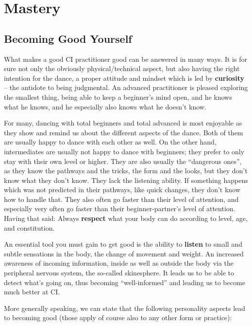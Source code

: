 \chapter{Mastery}\label{ch:mastery}


\section{Becoming Good Yourself}\label{sec:becoming-good-yourself}

What makes a good CI practitioner good can be answered in many ways.
It is for sure not only the obviously physical/technical aspect, but also having the right intention for the dance, a proper attitude and mindset which is led by \textbf{curiosity} -- the antidote to being judgmental.
An advanced practitioner is pleased exploring the smallest thing, being able to keep a beginner's mind open, and he knows what he knows, and he especially also knows what he doesn't know.

For many, dancing with total beginners and total advanced is most enjoyable as they show and remind us about the different aspects of the dance.
Both of them are usually happy to dance with each other as well.
On the other hand, intermediates are usually not happy to dance with beginners; they prefer to only stay with their own level or higher.
They are also usually the ``dangerous ones'', as they know the pathways and the tricks, the form and the looks, but they don't know what they don't know.
They lack the listening ability.
If something happens which was not predicted in their pathways, like quick changes, they don't know how to handle that.
They also often go faster than their level of attention, and especially very often go faster than their beginner-partner's level of attention.
Having that said: Always \textbf{respect} what your body can do according to level, age, and constitution.

An essential tool you must gain to get good is the ability to \textbf{listen} to small and subtle sensations in the body, the change of movement and weight.
An increased awareness of incoming information, inside as well as outside the body via the peripheral nervous system, the so-called \gls{skinesphere}.
It leads us to be able to detect what's going on, thus becoming ``well-informed'' and leading us to become much better at CI.

More generally speaking, we can state that the following personality aspects lead to becoming good (those apply of course also to any other form or practice):

